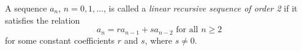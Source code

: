 

\setcounter{section}{1}
\setcounter{subsection}{2}
\setcounter{dfn}{2}

\begin{dfn}
A sequence $a_n$, $n = 0, 1, \ldots$, is called a \emph{linear recursive sequence of order 2} if
it satisfies the relation
\begin{equation}
\label{eqn:LinRec2}
a_n = ra_{n-1} + sa_{n-2} \text{ for all } n \ge 2
\end{equation}
for some constant coefficients $r$ and $s$, where $s \ne 0$.
\end{dfn}

